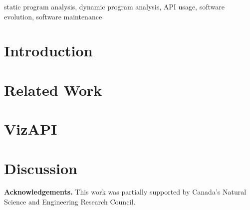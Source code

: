 \documentclass[conference]{IEEEtran}
\begin{document}
\begin{IEEEkeywords}
static program analysis,
dynamic program analysis,
API usage,
software evolution,
software maintenance
\end{IEEEkeywords}

\section{Introduction}


\section{Related Work}


\section{VizAPI}


\section{Discussion}


\small
\textbf{Acknowledgements. }This work was partially supported by Canada's Natural Science and Engineering Research Council.



\end{document}
